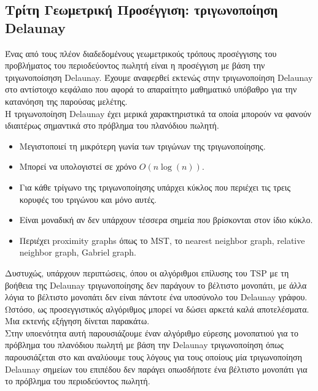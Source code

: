 \documentclass[oneside,12pt]{book}
\theoremstyle{definition}
\begin{document}
\subsection{Τρίτη Γεωμετρική Προσέγγιση: τριγωνοποίηση Delaunay}

Ένας από τους πλέον διαδεδομένους γεωμετρικούς τρόπους προσέγγισης του προβλήματος του περιοδεύοντος πωλητή είναι η προσέγγιση με βάση την τριγωνοποίσηση Delaunay. Έχουμε αναφερθεί εκτενώς στην τριγωνοποίηση Delaunay στο αντίστοιχο κεφάλαιο που αφορά το απαραίτητο μαθηματικό υπόβαθρο για την κατανόηση της παρούσας μελέτης. \\

Η τριγωνοποίηση Delaunay έχει μερικά χαρακτηριστικά τα οποία μπορούν να φανούν ιδιαιτέρως σημαντικά στο πρόβλημα του πλανόδιου πωλητή. 

\begin{itemize}
	\item Μεγιστοποιεί τη μικρότερη γωνία των τριγώνων της τριγωνοποίησης.
	\item Μπορεί να υπολογιστεί σε χρόνο \(Ο(n \log(n))\).
	\item Για κάθε τρίγωνο της τριγωνοποίησης υπάρχει κύκλος που περιέχει τις τρεις κορυφές του τριγώνου και μόνο αυτές.
	\item Είναι μοναδική αν δεν υπάρχουν τέσσερα σημεία που βρίσκονται στον ίδιο κύκλο.
	\item Περιέχει proximity graphs όπως το MST, το nearest neighbor graph, relative neighbor graph, Gabriel graph.
\end{itemize}

Δυστυχώς, υπάρχουν περιπτώσεις, όπου οι αλγόριθμοι επίλυσης του TSP με τη βοήθεια της Delaunay τριγωνοποίησης δεν παράγουν το βέλτιστο μονοπάτι, με άλλα λόγια το βέλτιστο μονοπάτι δεν είναι πάντοτε ένα υποσύνολο του Delaunay γράφου. Ωστόσο, ως προσεγγιστικός αλγόριθμος μπορεί να δώσει αρκετά καλά αποτελέσματα. Μια εκτενής εξήγηση δίνεται παρακάτω. \\

Στην υποενότητα αυτή παρουσιάζουμε έναν αλγόριθμο εύρεσης μονοπατιού για το πρόβλημα του πλανόδιου πωλητή με βάση την Delaunay τριγωνοποίηση όπως παρουσιάζεται στο \cite{10} και αναλύουμε τους λόγους για τους οποίους μία τριγωνοποίηση Delaunay σημείων του επιπέδου δεν παράγει οπωσδήποτε ένα βέλτιστο μονοπάτι για το πρόβλημα του περιοδεύοντος πωλητή. \\
\end{document}
